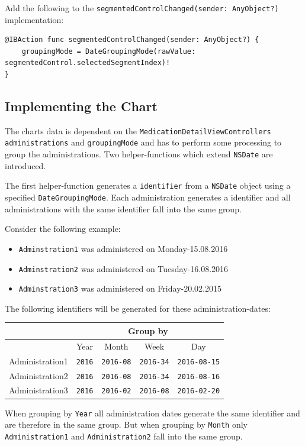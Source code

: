 \documentclass{article}
\begin{document}
Add the following to the
\texttt{segmentedControlChanged(sender:\ AnyObject?)} implementation:

\begin{verbatim}
@IBAction func segmentedControlChanged(sender: AnyObject?) {
    groupingMode = DateGroupingMode(rawValue: segmentedControl.selectedSegmentIndex)!
}
\end{verbatim}

\subsection{Implementing the Chart}\label{implementing-the-chart}

The charts data is dependent on the
\texttt{MedicationDetailViewControllers} \texttt{administrations} and
\texttt{groupingMode} and has to perform some processing to group the
administrations. Two helper-functions which extend \texttt{NSDate} are
introduced.

The first helper-function generates a \texttt{identifier} from a
\texttt{NSDate} object using a specified \texttt{DateGroupingMode}. Each
administration generates a identifier and all administrations with the
same identifier fall into the same group.

Consider the following example:
\begin{itemize}
  \item
    \texttt{Adminstration1} was administered on Monday-15.08.2016
  \item
    \texttt{Adminstration2} was administered on Tuesday-16.08.2016
  \item
    \texttt{Adminstration3} was administered on Friday-20.02.2015
\end{itemize}

The following identifiers will be generated for these
administration-dates:

\begin{tabular}[H]{ |c|c|c|c|c| }
  \hline
  & \multicolumn{4}{|c|}{Group by} \\
  \hline
  & Year          & Month & Week & Day \\
  \hline
  Administration1 & \texttt{2016} & \texttt{2016-08} & \texttt{2016-34} &
  \texttt{2016-08-15}\\
  Administration2 & \texttt{2016} & \texttt{2016-08} & \texttt{2016-34} &
  \texttt{2016-08-16}\\
  Administration3 & \texttt{2016} & \texttt{2016-02} & \texttt{2016-08} &
  \texttt{2016-02-20}\\
  \hline
\end{tabular}
When grouping by \texttt{Year} all administration dates generate the
same identifier and are therefore in the same group. But when grouping
by \texttt{Month} only \texttt{Administration1} and
\texttt{Administration2} fall into the same group.
\end{document}
